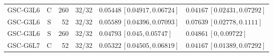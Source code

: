 \documentclass[10pt,a4paper]{article}
\begin{document}
\begin{longtable}{lcrcp{44mm}p{44mm}}
GSC-G3L6 & C & 260 & 32/32 & \(0.05448\,[0.04917,0.06724]\) & \(0.04167\,[0.02431,0.07292]\)\\
GSC-G3L6 & S & 52 & 32/32 & \(0.05589\,[0.04396,0.07093]\) & \(0.07639\,[0.02778,0.1111]\)\\
GSC-G3L6 & S & 260 & 32/32 & \(0.04793\,[0.045,0.05747]\) & \(0.04861\,[0,0.09722]\)\\
GSC-G6L7 & C & 52 & 32/32 & \(0.05322\,[0.04505,0.06819]\) & \(0.04167\,[0.01389,0.07292]\)\\

\end{longtable}
\end{document}
